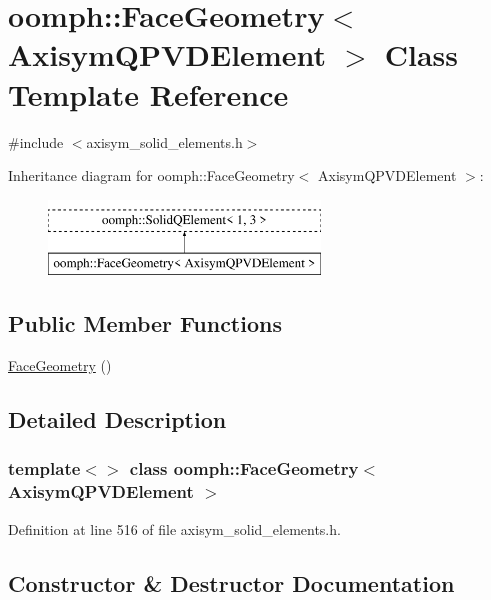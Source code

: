\hypertarget{classoomph_1_1FaceGeometry_3_01AxisymQPVDElement_01_4}{}\section{oomph\+:\+:Face\+Geometry$<$ Axisym\+Q\+P\+V\+D\+Element $>$ Class Template Reference}
\label{classoomph_1_1FaceGeometry_3_01AxisymQPVDElement_01_4}


{\ttfamily \#include $<$axisym\+\_\+solid\+\_\+elements.\+h$>$}

Inheritance diagram for oomph\+:\+:Face\+Geometry$<$ Axisym\+Q\+P\+V\+D\+Element $>$\+:\begin{figure}[H]
\begin{center}
\leavevmode
\includegraphics[height=2.000000cm]{classoomph_1_1FaceGeometry_3_01AxisymQPVDElement_01_4}
\end{center}
\end{figure}
\subsection*{Public Member Functions}
\begin{DoxyCompactItemize}
\item 
\hyperlink{classoomph_1_1FaceGeometry_3_01AxisymQPVDElement_01_4_abb5982a84777aae9af36598c82c564da}{Face\+Geometry} ()
\end{DoxyCompactItemize}


\subsection{Detailed Description}
\subsubsection*{template$<$$>$\newline
class oomph\+::\+Face\+Geometry$<$ Axisym\+Q\+P\+V\+D\+Element $>$}



Definition at line 516 of file axisym\+\_\+solid\+\_\+elements.\+h.



\subsection{Constructor \& Destructor Documentation}
\mbox{\label{classoomph_1_1FaceGeometry_3_01AxisymQPVDElement_01_4_abb5982a84777aae9af36598c82c564da}} 
